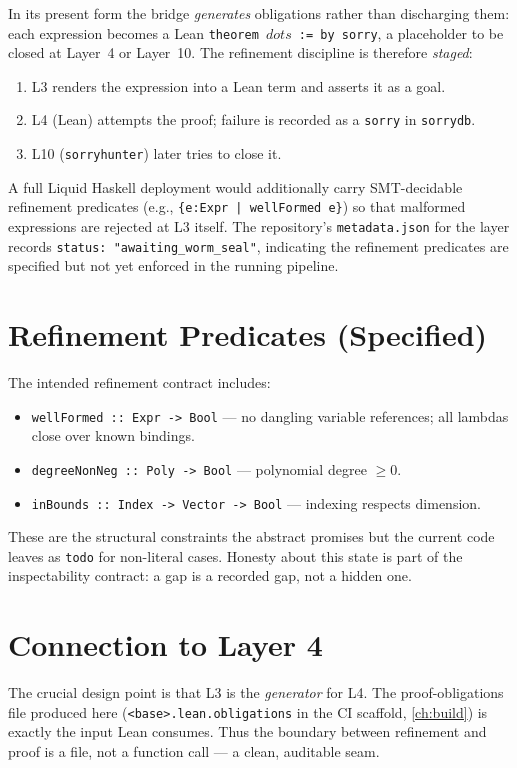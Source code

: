 In its present form the bridge \emph{generates} obligations rather than
discharging them: each expression becomes a Lean \texttt{theorem \ensuremath{dots} := by
sorry}, a placeholder to be closed at Layer~4 or Layer~10. The refinement
discipline is therefore \emph{staged}:
\begin{enumerate}
  \item L3 renders the expression into a Lean term and asserts it as a goal.
  \item L4 (Lean) attempts the proof; failure is recorded as a
        \texttt{sorry} in \texttt{sorrydb}.
  \item L10 (\texttt{sorryhunter}) later tries to close it.
\end{enumerate}
A full Liquid Haskell deployment would additionally carry SMT-decidable
refinement predicates (e.g., \texttt{\{e:Expr | wellFormed e\}}) so that
malformed expressions are rejected at L3 itself. The repository's
\texttt{metadata.json} for the layer records \texttt{status: "awaiting\_worm\_seal"},
indicating the refinement predicates are specified but not yet enforced in the
running pipeline.

\section{Refinement Predicates (Specified)}
\label{sec:liq-pred}

The intended refinement contract includes:
\begin{itemize}
  \item \texttt{wellFormed :: Expr -> Bool} --- no dangling variable
        references; all lambdas close over known bindings.
  \item \texttt{degreeNonNeg :: Poly -> Bool} --- polynomial degree $\ge 0$.
  \item \texttt{inBounds :: Index -> Vector -> Bool} --- indexing respects
        dimension.
\end{itemize}
These are the structural constraints the abstract promises but the current
code leaves as \texttt{todo} for non-literal cases. Honesty about this state
is part of the inspectability contract: a gap is a recorded gap, not a hidden
one.

\section{Connection to Layer 4}
\label{sec:liq-to-lean}

The crucial design point is that L3 is the \emph{generator} for L4. The
proof-obligations file produced here (\texttt{<base>.lean.obligations} in the
CI scaffold, \cref{ch:build}) is exactly the input Lean consumes. Thus the
boundary between refinement and proof is a file, not a function call --- a
clean, auditable seam.


